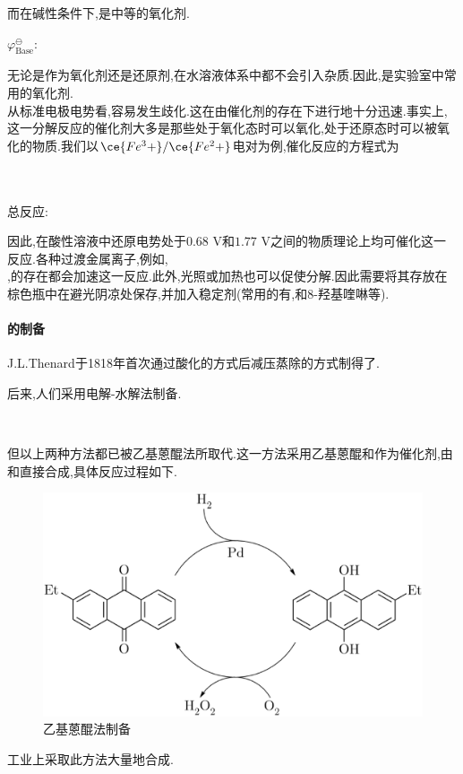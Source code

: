 \documentclass{ctexart}
\begin{document}
\indent 而在碱性条件下,是中等的氧化剂.
\begin{center}
    $\varphi^\ominus_{\text{Base}}$:\ \ \ 
\end{center}

\indent 无论是作为氧化剂还是还原剂,在水溶液体系中都不会引入杂质.因此,是实验室中常用的氧化剂.\\
\indent 从标准电极电势看,容易发生歧化.这在由催化剂的存在下进行地十分迅速.事实上,这一分解反应的催化剂大多是那些处于氧化态时可以氧化,处于还原态时可以被氧化的物质.我们以$\ce{Fe^3+}/\ce{Fe^2+}$电对为例,催化反应的方程式为
\begin{center}
    \\
    \\
    总反应:
\end{center}
因此,在酸性溶液中还原电势处于$0.68\text{ V}$和$1.77\text{ V}$之间的物质理论上均可催化这一反应.各种过渡金属离子,例如,\\,的存在都会加速这一反应.此外,光照或加热也可以促使分解.因此需要将其存放在棕色瓶中在避光阴凉处保存,并加入稳定剂(常用的有,和8-羟基喹啉等).
\paragraph{的制备} J.L.Thenard于1818年首次通过酸化的方式后减压蒸除的方式制得了.
\begin{center}
\end{center}

\indent 后来,人们采用电解-水解法制备.
\begin{center}
    \\
\end{center}

\indent 但以上两种方法都已被乙基蒽醌法所取代.这一方法采用乙基蒽醌和作为催化剂,由和直接合成,具体反应过程如下.
\begin{figure}[H]
    \centering\includegraphics[scale=0.25]{picture/H2O2Prod.eps}
    \caption{乙基蒽醌法制备}
\end{figure}
工业上采取此方法大量地合成.
\end{document}
